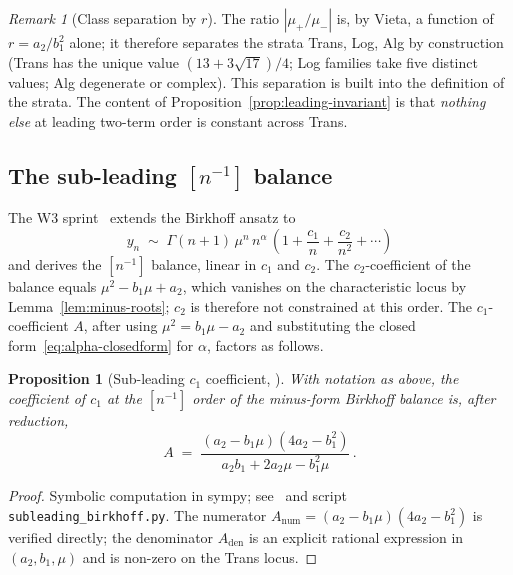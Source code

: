 \documentclass[11pt]{amsart}
\newtheorem{proposition}[theorem]{Proposition}
\theoremstyle{definition}
\theoremstyle{remark}
\newtheorem{remark}[theorem]{Remark}
\begin{document}
\begin{remark}[Class separation by $r$]
The ratio $|\mu_+/\mu_-|$ is, by Vieta, a function of $r=a_2/b_1^2$
alone; it therefore separates the strata Trans, Log, Alg by
construction (Trans has the unique value $(13+3\sqrt{17})/4$; Log
families take five distinct values; Alg degenerate or complex).
This separation is built into the definition of the strata.  The
content of Proposition~\ref{prop:leading-invariant} is that
\emph{nothing else} at leading two-term order is constant across
Trans.
\end{remark}

\subsection{The sub-leading $[n^{-1}]$ balance}\label{sec:subleading}

The W3 sprint~\cite{SprintW3Report} extends the Birkhoff ansatz to
\[
  y_n \;\sim\; \Gamma(n+1)\,\mu^n\,n^\alpha\,
  \left(1 + \frac{c_1}{n} + \frac{c_2}{n^2} + \cdots\right)
\]
and derives the $[n^{-1}]$ balance, linear in $c_1$ and $c_2$.  The
$c_2$-coefficient of the balance equals $\mu^2 - b_1\mu + a_2$, which
vanishes on the characteristic locus by Lemma~\ref{lem:minus-roots};
$c_2$ is therefore not constrained at this order.  The
$c_1$-coefficient $A$, after using $\mu^2 = b_1\mu - a_2$ and
substituting the closed form~\eqref{eq:alpha-closedform} for $\alpha$,
factors as follows.

\begin{proposition}[Sub-leading $c_1$ coefficient, \cite{SprintW3Report}]
\label{prop:c1-coefficient}
With notation as above, the coefficient of $c_1$ at the $[n^{-1}]$
order of the minus-form Birkhoff balance is, after reduction,
\begin{equation}\label{eq:c1-A}
  A \;=\; \frac{(a_2 - b_1\mu)(4 a_2 - b_1^2)}%
                {a_2 b_1 + 2 a_2\mu - b_1^2\mu}\,.
\end{equation}
\end{proposition}
\begin{proof}
Symbolic computation in sympy; see~\cite[]{SprintW3Report}
and script \texttt{subleading\_birkhoff.py}.  The numerator
$A_{\text{num}} = (a_2-b_1\mu)(4 a_2 - b_1^2)$ is verified directly;
the denominator $A_{\text{den}}$ is an explicit rational
expression in $(a_2,b_1,\mu)$ and is non-zero on the Trans locus.
\end{proof}
\end{document}
